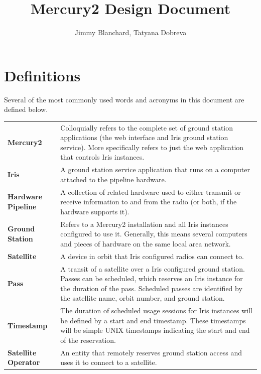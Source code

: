 \documentclass{mxl-note}
\begin{document}
\title{Mercury2 Design Document}
\author{Jimmy Blanchard, Tatyana Dobreva}
\setcounter{secnumdepth}{5}

\maketitle
\tableofcontents
\newpage 

\section{Definitions} 
Several of the most commonly used words and acronyms in this document are defined below.

\begin{table}[h]
	\footnotesize {\begin{tabular}{ p{5cm} p{10cm} }
		\textbf{Mercury2} & Colloquially refers to the complete set of ground station applications (the web interface and Iris ground station service). More specifically refers to just the web application that controls Iris instances.\\[.2cm]
		\textbf{Iris} & A ground station service application that runs on a computer attached to the pipeline hardware.\\[.2cm]
		\textbf{Hardware Pipeline} & A collection of related hardware used to either transmit or receive information to and from the radio (or both, if the hardware supports it).\\[.2cm]
		\textbf{Ground Station} & Refers to a Mercury2 installation and all Iris instances configured to use it. Generally, this means several computers and pieces of hardware on the same local area network.\\[.2cm]
		\textbf{Satellite} & A device in orbit that Iris configured radios can connect to.\\[.2cm]
		\textbf{Pass} & A transit of a satellite over a Iris configured ground station. Passes can be scheduled, which reserves an Iris instance for the duration of the pass. Scheduled passes are identified by the satellite name, orbit number, and ground station.\\[.2cm]
		\textbf{Timestamp} & The duration of scheduled usage sessions for Iris instances will be defined by a start and end timestamp. These timestamps will be simple UNIX timestamps indicating the start and end of the reservation.\\[.2cm]
		\textbf{Satellite Operator} & An entity that remotely reserves ground station access and uses it to connect to a satellite.\\[.2cm]

\end{tabular}}
\end{table}
\end{document}
